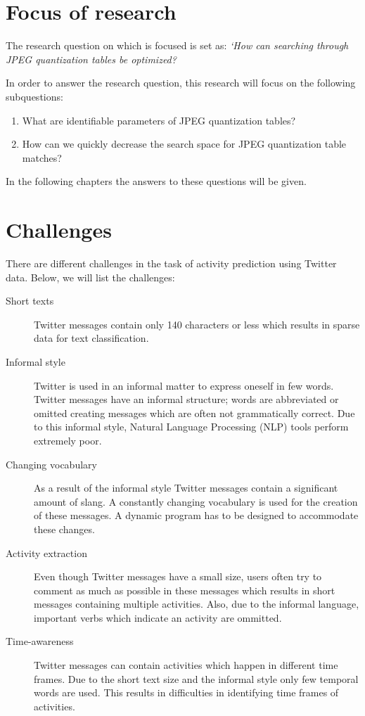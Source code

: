 \section{Focus of research}
The research question on which is focused is set as: \textit{`How can searching through JPEG quantization tables be optimized?}

In order to answer the research question, this research will focus on the following subquestions:
\begin{enumerate}
\item What are identifiable parameters of JPEG quantization tables?
\item How can we quickly decrease the search space for JPEG quantization table matches?
\end{enumerate}
In the following chapters the answers to these questions will be given.
\iffalse
\section{Challenges}\label{challenges}

There are different challenges in the task of activity prediction using Twitter data. Below, we will list the challenges:

\begin{description}
\item[Short texts] Twitter messages contain only 140 characters or less which results in sparse data for text classification.
\item[Informal style] Twitter is used in an informal matter to express oneself in few words. Twitter messages have an informal structure; words are abbreviated or omitted creating messages which are often not grammatically correct. Due to this informal style, Natural Language Processing (NLP) tools perform extremely poor.
\item[Changing vocabulary] As a result of the informal style Twitter messages contain a significant amount of slang. A constantly changing vocabulary is used for the creation of these messages. A dynamic program has to be designed to accommodate these changes.
\item[Activity extraction] Even though Twitter messages have a small size, users often try to comment as much as possible in these messages which results in short messages containing multiple activities. Also, due to the informal language, important verbs which indicate an activity are ommitted.
\item[Time-awareness] Twitter messages can contain activities which happen in different time frames. Due to the short text size and the informal style only few temporal words are used. This results in difficulties in identifying time frames of activities.
\end{description}

